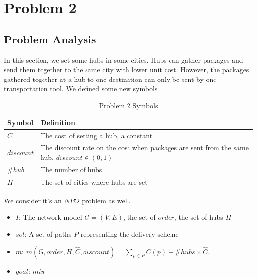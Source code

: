 \documentclass{llncs}
\begin{document}
\par 

\newpage
\section{Problem 2}
\subsection{Problem Analysis}
In this section, we set some hubs in some cities. Hubs can gather packages and send them together to the same city with lower unit cost. However, the packages gathered together at a hub to one
destination can only be sent by one transportation tool. We defined some new symbols \\
\begin{table}
  \caption{Problem 2 Symbols}\label{sym2}
  \centering
  \begin{tabular}{|l|l|}
  \hline
  Symbol &  Definition \\
  \hline
  $\hat{C}$ & The cost of setting a hub, a constant\\
  \hline
  $discount$ & The discount rate on the cost when packages are sent from the same hub, $discount\in (0,1)$\\
  \hline
  $\#hub$ & The number of hubs \\
  \hline
  $H$ & The set of cities where hubs are set \\
  \hline
  \end{tabular}
\end{table}
We consider it's an $NPO$ problem as well.
\begin{itemize}
  \item $I$: The network model $G=(V,E)$, the set of $order$, the set of hubs $H$
  \item $sol$: A set of paths $P$ representing the delivery scheme
  \item $m$: $m(G,order,H,\hat{C},discount)=\sum_{p \in P}C(p)+\#hubs\times\hat{C}$.
  \item $goal$: $min$
\end{itemize}
\end{document}
